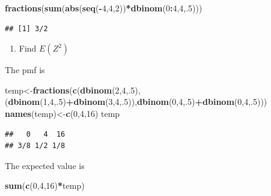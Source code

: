 \documentclass[]{book}
\newenvironment{Shaded}{\begin{snugshade}}{\end{snugshade}}
\newcommand{\KeywordTok}[1]{\textcolor[rgb]{0.13,0.29,0.53}{\textbf{#1}}}
\newcommand{\DecValTok}[1]{\textcolor[rgb]{0.00,0.00,0.81}{#1}}
\newcommand{\OperatorTok}[1]{\textcolor[rgb]{0.81,0.36,0.00}{\textbf{#1}}}
\newcommand{\NormalTok}[1]{#1}
\providecommand{\tightlist}{%
  \setlength{\itemsep}{0pt}\setlength{\parskip}{0pt}}
\theoremstyle{definition}
\theoremstyle{definition}
\theoremstyle{definition}
\theoremstyle{remark}
\begin{document}
\begin{Shaded}
\begin{Highlighting}[]
\KeywordTok{fractions}\NormalTok{(}\KeywordTok{sum}\NormalTok{(}\KeywordTok{abs}\NormalTok{(}\KeywordTok{seq}\NormalTok{(}\OperatorTok{-}\DecValTok{4}\NormalTok{,}\DecValTok{4}\NormalTok{,}\DecValTok{2}\NormalTok{))}\OperatorTok{*}\KeywordTok{dbinom}\NormalTok{(}\DecValTok{0}\OperatorTok{:}\DecValTok{4}\NormalTok{,}\DecValTok{4}\NormalTok{,.}\DecValTok{5}\NormalTok{)))}
\end{Highlighting}
\end{Shaded}

\begin{verbatim}
## [1] 3/2
\end{verbatim}

\begin{enumerate}
\def\labelenumi{\arabic{enumi}.}
\setcounter{enumi}{2}
\tightlist
\item
  Find \(E(Z^2)\)
\end{enumerate}

The pmf is

\begin{Shaded}
\begin{Highlighting}[]
\NormalTok{temp<-}\KeywordTok{fractions}\NormalTok{(}\KeywordTok{c}\NormalTok{(}\KeywordTok{dbinom}\NormalTok{(}\DecValTok{2}\NormalTok{,}\DecValTok{4}\NormalTok{,.}\DecValTok{5}\NormalTok{),(}\KeywordTok{dbinom}\NormalTok{(}\DecValTok{1}\NormalTok{,}\DecValTok{4}\NormalTok{,.}\DecValTok{5}\NormalTok{)}\OperatorTok{+}\KeywordTok{dbinom}\NormalTok{(}\DecValTok{3}\NormalTok{,}\DecValTok{4}\NormalTok{,.}\DecValTok{5}\NormalTok{)),}\KeywordTok{dbinom}\NormalTok{(}\DecValTok{0}\NormalTok{,}\DecValTok{4}\NormalTok{,.}\DecValTok{5}\NormalTok{)}\OperatorTok{+}\KeywordTok{dbinom}\NormalTok{(}\DecValTok{0}\NormalTok{,}\DecValTok{4}\NormalTok{,.}\DecValTok{5}\NormalTok{)))}
\KeywordTok{names}\NormalTok{(temp)<-}\KeywordTok{c}\NormalTok{(}\DecValTok{0}\NormalTok{,}\DecValTok{4}\NormalTok{,}\DecValTok{16}\NormalTok{)}
\NormalTok{temp}
\end{Highlighting}
\end{Shaded}

\begin{verbatim}
##   0   4  16 
## 3/8 1/2 1/8
\end{verbatim}

The expected value is

\begin{Shaded}
\begin{Highlighting}[]
\KeywordTok{sum}\NormalTok{(}\KeywordTok{c}\NormalTok{(}\DecValTok{0}\NormalTok{,}\DecValTok{4}\NormalTok{,}\DecValTok{16}\NormalTok{)}\OperatorTok{*}\NormalTok{temp)}
\end{Highlighting}
\end{Shaded}
\end{document}
